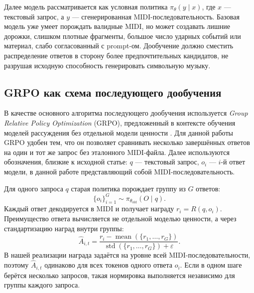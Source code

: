 \documentclass[a4paper,12pt]{extarticle}
\begin{document}
Далее модель рассматривается как условная политика
$\pi_\theta(y \mid x)$, где $x$ --- текстовый запрос, а $y$ ---
сгенерированная MIDI-последовательность. Базовая модель уже умеет
порождать валидные MIDI, но может создавать лишние дорожки, слишком
плотные фрагменты, большое число ударных событий или материал, слабо
согласованный с prompt-ом. Дообучение должно сместить распределение
ответов в сторону более предпочтительных кандидатов, не разрушая
исходную способность генерировать символьную музыку.

\subsection{GRPO как схема последующего дообучения}

В качестве основного алгоритма последующего дообучения используется
\textit{Group Relative Policy Optimization} (GRPO), предложенный в
контексте обучения моделей рассуждения без отдельной модели ценности
\cite{deepseekmath2024}. Для данной работы GRPO удобен тем, что он
позволяет сравнивать несколько завершённых ответов на один и тот же
запрос без эталонного MIDI-файла. Далее используются обозначения,
близкие к исходной статье: $q$ --- текстовый запрос, $o_i$ --- $i$-й
ответ модели, в данной работе представляющий собой MIDI-последовательность.

Для одного запроса $q$ старая политика порождает группу из $G$ ответов:
\[
\{o_i\}_{i=1}^G \sim \pi_{\theta_{\mathrm{old}}}(O \mid q).
\]
Каждый ответ декодируется в MIDI и получает награду $r_i=R(q,o_i)$.
Преимущество ответа вычисляется не отдельной моделью ценности, а через
стандартизацию наград внутри группы:
\[
\hat{A}_{i,t} =
\frac{r_i - \operatorname{mean}(\{r_1,\ldots,r_G\})}
{\operatorname{std}(\{r_1,\ldots,r_G\})+\varepsilon}.
\]
В нашей реализации награда задаётся на уровне всей MIDI-последовательности,
поэтому $\hat{A}_{i,t}$ одинаково для всех токенов одного ответа $o_i$.
Если в одном шаге берётся несколько запросов, такая нормировка
выполняется независимо для группы каждого запроса.
\end{document}

